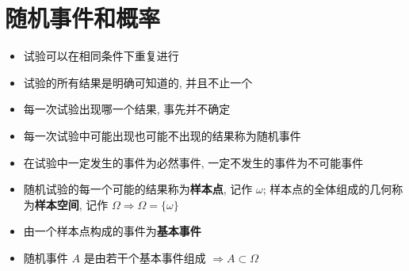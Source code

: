 \chapter{随机事件和概率}

\begin{definition}[随机试验]
	\begin{itemize}
		\item 试验可以在相同条件下重复进行
		\item 试验的所有结果是明确可知道的, 并且不止一个
		\item 每一次试验出现哪一个结果, 事先并不确定
	\end{itemize}
\end{definition}
\begin{definition}[随机事件]
	\begin{itemize}
		\item 每一次试验中可能出现也可能不出现的结果称为随机事件
		\item 在试验中一定发生的事件为必然事件, 一定不发生的事件为不可能事件
	\end{itemize}
\end{definition}

\begin{definition}[样本空间]
	\begin{itemize}
		\item 随机试验的每一个可能的结果称为\textbf{样本点}, 记作 $\omega$; 样本点的全体组成的几何称为\textbf{样本空间}, 记作 
		$\Omega\Rightarrow \Omega = \{\omega\}$
		\item 由一个样本点构成的事件为\textbf{基本事件}
		\item 随机事件 $A$ 是由若干个基本事件组成 $\Rightarrow A \subset \Omega$
	\end{itemize}
\end{definition}

